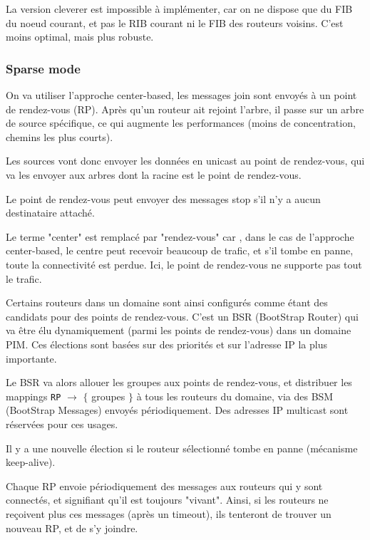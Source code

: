 		La version cleverer est impossible à implémenter, car on ne dispose que du FIB du noeud courant, et pas le RIB courant ni le FIB des routeurs voisins. C'est moins optimal, mais plus robuste.
		
		
		\subsubsection{Sparse mode}
		
		On va utiliser l'approche center-based, les messages join sont envoyés à un point de rendez-vous (RP). Après qu'un routeur ait rejoint l'arbre, il passe sur un arbre de source spécifique, ce qui augmente les performances (moins de concentration, chemins les plus courts).
		
		
		Les sources vont donc envoyer les données en unicast au point de rendez-vous, qui va les envoyer aux arbres dont la racine est le point de rendez-vous.
		
		Le point de rendez-vous peut envoyer des messages stop s'il n'y a aucun destinataire attaché.
		
		Le terme "center" est remplacé par "rendez-vous" car , dans le cas de l'approche center-based, le centre peut recevoir beaucoup de trafic, et s'il tombe en panne, toute la connectivité est perdue. Ici, le point de rendez-vous ne supporte pas tout le trafic.
		
		Certains routeurs dans un domaine sont ainsi configurés comme étant des candidats pour des points de rendez-vous. C'est un BSR (BootStrap Router) qui va être élu dynamiquement (parmi les points de rendez-vous) dans un domaine PIM. Ces élections sont basées sur des priorités et sur l'adresse IP la plus importante.
		
		Le BSR va alors allouer les groupes aux points de rendez-vous, et distribuer les mappings \texttt{RP} $\rightarrow$ $\lbrace$ groupes $\rbrace$ à tous les routeurs du domaine, via des BSM (BootStrap Messages) envoyés périodiquement. Des adresses IP multicast sont réservées pour ces usages.
		
			
		Il y a une nouvelle élection si le routeur sélectionné tombe en panne (mécanisme keep-alive).
		
		Chaque RP envoie périodiquement des messages aux routeurs qui y sont connectés, et signifiant qu'il est toujours "vivant". Ainsi, si les routeurs ne reçoivent plus ces messages (après un timeout), ils tenteront de trouver un nouveau RP, et de s'y joindre.
		
